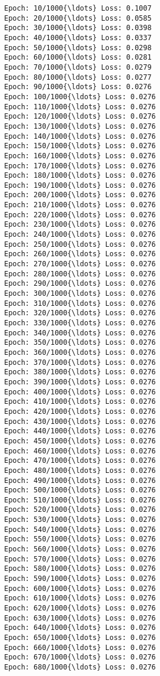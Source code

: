 \documentclass[11pt]{article}
\begin{document}
    \begin{Verbatim}[commandchars=\\\{\}]
Epoch: 10/1000{\ldots} Loss: 0.1007
Epoch: 20/1000{\ldots} Loss: 0.0585
Epoch: 30/1000{\ldots} Loss: 0.0398
Epoch: 40/1000{\ldots} Loss: 0.0337
Epoch: 50/1000{\ldots} Loss: 0.0298
Epoch: 60/1000{\ldots} Loss: 0.0281
Epoch: 70/1000{\ldots} Loss: 0.0279
Epoch: 80/1000{\ldots} Loss: 0.0277
Epoch: 90/1000{\ldots} Loss: 0.0276
Epoch: 100/1000{\ldots} Loss: 0.0276
Epoch: 110/1000{\ldots} Loss: 0.0276
Epoch: 120/1000{\ldots} Loss: 0.0276
Epoch: 130/1000{\ldots} Loss: 0.0276
Epoch: 140/1000{\ldots} Loss: 0.0276
Epoch: 150/1000{\ldots} Loss: 0.0276
Epoch: 160/1000{\ldots} Loss: 0.0276
Epoch: 170/1000{\ldots} Loss: 0.0276
Epoch: 180/1000{\ldots} Loss: 0.0276
Epoch: 190/1000{\ldots} Loss: 0.0276
Epoch: 200/1000{\ldots} Loss: 0.0276
Epoch: 210/1000{\ldots} Loss: 0.0276
Epoch: 220/1000{\ldots} Loss: 0.0276
Epoch: 230/1000{\ldots} Loss: 0.0276
Epoch: 240/1000{\ldots} Loss: 0.0276
Epoch: 250/1000{\ldots} Loss: 0.0276
Epoch: 260/1000{\ldots} Loss: 0.0276
Epoch: 270/1000{\ldots} Loss: 0.0276
Epoch: 280/1000{\ldots} Loss: 0.0276
Epoch: 290/1000{\ldots} Loss: 0.0276
Epoch: 300/1000{\ldots} Loss: 0.0276
Epoch: 310/1000{\ldots} Loss: 0.0276
Epoch: 320/1000{\ldots} Loss: 0.0276
Epoch: 330/1000{\ldots} Loss: 0.0276
Epoch: 340/1000{\ldots} Loss: 0.0276
Epoch: 350/1000{\ldots} Loss: 0.0276
Epoch: 360/1000{\ldots} Loss: 0.0276
Epoch: 370/1000{\ldots} Loss: 0.0276
Epoch: 380/1000{\ldots} Loss: 0.0276
Epoch: 390/1000{\ldots} Loss: 0.0276
Epoch: 400/1000{\ldots} Loss: 0.0276
Epoch: 410/1000{\ldots} Loss: 0.0276
Epoch: 420/1000{\ldots} Loss: 0.0276
Epoch: 430/1000{\ldots} Loss: 0.0276
Epoch: 440/1000{\ldots} Loss: 0.0276
Epoch: 450/1000{\ldots} Loss: 0.0276
Epoch: 460/1000{\ldots} Loss: 0.0276
Epoch: 470/1000{\ldots} Loss: 0.0276
Epoch: 480/1000{\ldots} Loss: 0.0276
Epoch: 490/1000{\ldots} Loss: 0.0276
Epoch: 500/1000{\ldots} Loss: 0.0276
Epoch: 510/1000{\ldots} Loss: 0.0276
Epoch: 520/1000{\ldots} Loss: 0.0276
Epoch: 530/1000{\ldots} Loss: 0.0276
Epoch: 540/1000{\ldots} Loss: 0.0276
Epoch: 550/1000{\ldots} Loss: 0.0276
Epoch: 560/1000{\ldots} Loss: 0.0276
Epoch: 570/1000{\ldots} Loss: 0.0276
Epoch: 580/1000{\ldots} Loss: 0.0276
Epoch: 590/1000{\ldots} Loss: 0.0276
Epoch: 600/1000{\ldots} Loss: 0.0276
Epoch: 610/1000{\ldots} Loss: 0.0276
Epoch: 620/1000{\ldots} Loss: 0.0276
Epoch: 630/1000{\ldots} Loss: 0.0276
Epoch: 640/1000{\ldots} Loss: 0.0276
Epoch: 650/1000{\ldots} Loss: 0.0276
Epoch: 660/1000{\ldots} Loss: 0.0276
Epoch: 670/1000{\ldots} Loss: 0.0276
Epoch: 680/1000{\ldots} Loss: 0.0276

\end{Verbatim}
\end{document}

